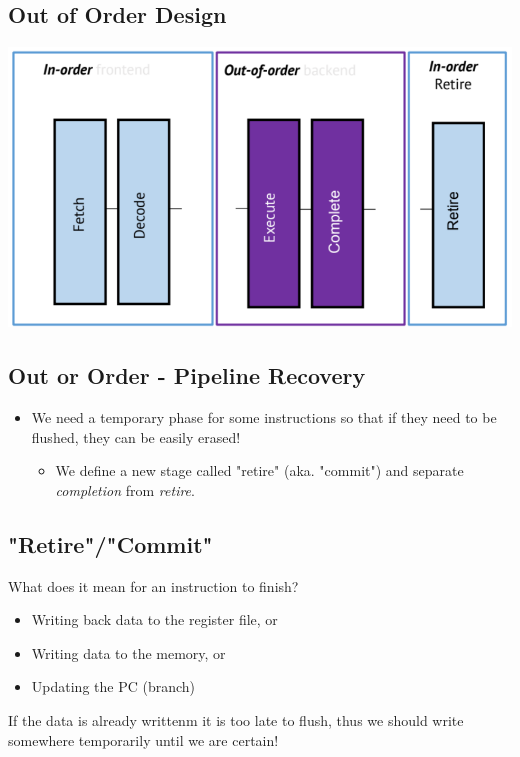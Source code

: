 \documentclass[10pt]{article}
\begin{document}
\subsection*{Out of Order Design}
\begin{center}
    \includegraphics*[scale=0.8]{W5_1.png}
\end{center}

\subsection*{Out or Order - Pipeline Recovery}
\begin{itemize}
    \item We need a temporary phase for some instructions so that if they need to be flushed, they can be easily erased!
    \begin{itemize}
        \item We define a new stage called "retire" (aka. "commit") and separate \textit{completion} from \textit{retire}.
    \end{itemize}
\end{itemize}

\subsection*{"Retire"/"Commit"}
What does it mean for an instruction to finish?
\begin{itemize}
    \item Writing back data to the register file, or
    \item Writing data to the memory, or
    \item Updating the PC (branch)
\end{itemize}
If the data is already writtenm it is too late to flush, thus we should write somewhere temporarily until we are certain!
\end{document}
